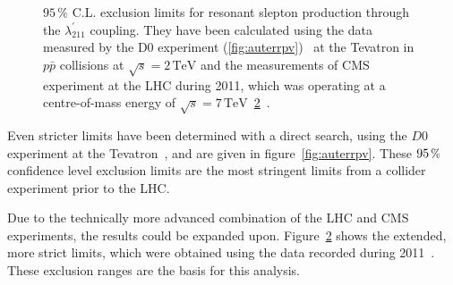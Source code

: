 \begin{figure}[!htbp]
\begin{subfigure}[b]{0.77\textwidth}
    \caption{\label{fig:2011rpv}}
  \end{subfigure}
  \caption{$95\,\%$ C.L. exclusion limits for resonant slepton production through the $\lambda^{\prime}_{211}$ coupling. They have been calculated using the data measured by the D0 experiment (\ref{fig:auterrpv})~\cite{auter} at the Tevatron in $p\bar{p}$ collisions at $\sqrt{s} = 2\,\text{TeV}$ and the measurements of CMS experiment at the LHC during 2011, which was operating at a centre-of-mass energy of $\sqrt{s} = 7\,\text{TeV}$~\ref{fig:2011rpv}~\cite{2011rpv}.}
\end{figure}

Even stricter limits have been determined with a direct search, using the $D0$ experiment at the Tevatron~\cite{auter,d0rpv}, and are given in figure~\ref{fig:auterrpv}. These $95\,\pct$ confidence level exclusion limits are the most stringent limits from a collider experiment prior to the LHC.

Due to the technically more advanced combination of the LHC and CMS experiments, the results could be expanded upon. Figure~\ref{fig:2011rpv} shows the extended, more strict limits, which were obtained using the data recorded during 2011~\cite{2011rpv}. These exclusion ranges are the basis for this analysis.



